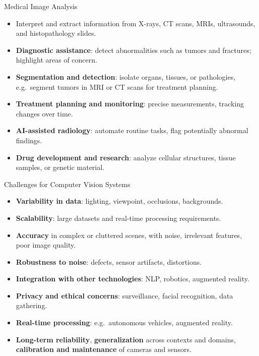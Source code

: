 \begin{frame}{Medical Image Analysis}
\begin{itemize}
  \item Interpret and extract information from X-rays, CT scans, MRIs, ultrasounds, and histopathology slides.
  \item \textbf{Diagnostic assistance}: detect abnormalities such as tumors and fractures; highlight areas of concern.
  \item \textbf{Segmentation and detection}: isolate organs, tissues, or pathologies, e.g.\ segment tumors in MRI or CT scans for treatment planning.
  \item \textbf{Treatment planning and monitoring}: precise measurements, tracking changes over time.
  \item \textbf{AI-assisted radiology}: automate routine tasks, flag potentially abnormal findings.
  \item \textbf{Drug development and research}: analyze cellular structures, tissue samples, or genetic material.
\end{itemize}
\end{frame}

\begin{frame}{Challenges for Computer Vision Systems}
\small%
\begin{itemize}
  \item \textbf{Variability in data}: lighting, viewpoint, occlusions, backgrounds.
  \item \textbf{Scalability}: large datasets and real-time processing requirements.
  \item \textbf{Accuracy} in complex or cluttered scenes, with noise, irrelevant features, poor image quality.
  \item \textbf{Robustness to noise}: defects, sensor artifacts, distortions.
  \item \textbf{Integration with other technologies}: NLP, robotics, augmented reality.
  \item \textbf{Privacy and ethical concerns}: surveillance, facial recognition, data gathering.
  \item \textbf{Real-time processing}: e.g.\ autonomous vehicles, augmented reality.
  \item \textbf{Long-term reliability}, \textbf{generalization} across contexts and domains, \textbf{calibration and maintenance} of cameras and sensors.
\end{itemize}
\end{frame}

